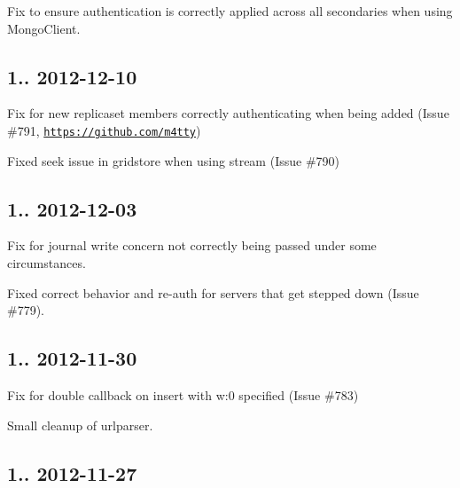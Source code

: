 \begin{DoxyItemize}
\item Fix to ensure authentication is correctly applied across all secondaries when using Mongo\+Client.
\end{DoxyItemize}

\subsection*{1.. 2012-\/12-\/10 }


\begin{DoxyItemize}
\item Fix for new replicaset members correctly authenticating when being added (Issue \#791, \href{https://github.com/m4tty}{\tt https\+://github.\+com/m4tty})
\item Fixed seek issue in gridstore when using stream (Issue \#790)
\end{DoxyItemize}

\subsection*{1.. 2012-\/12-\/03 }


\begin{DoxyItemize}
\item Fix for journal write concern not correctly being passed under some circumstances.
\item Fixed correct behavior and re-\/auth for servers that get stepped down (Issue \#779).
\end{DoxyItemize}

\subsection*{1.. 2012-\/11-\/30 }


\begin{DoxyItemize}
\item Fix for double callback on insert with w\+:0 specified (Issue \#783)
\item Small cleanup of urlparser.
\end{DoxyItemize}

\subsection*{1.. 2012-\/11-\/27 }



